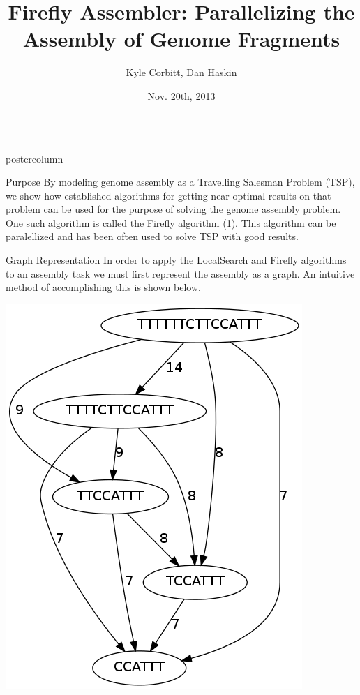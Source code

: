 \documentclass[final,hyperref={pdfpagelabels=false}]{beamer}
\title{\huge Firefly Assembler: Parallelizing the Assembly of Genome Fragments}
\author{Kyle Corbitt, Dan Haskin}
\institute[Brigham Young University]{Molecular Biology and Computer Science Departments}
\date[Nov. 20th, 2013]{Nov. 20th, 2013}
\newlength{\columnheight}
\begin{document}
\begin{frame}
    \begin{columns}
        \begin{column}{.32\textwidth}
            \begin{beamercolorbox}[center,wd=\textwidth]{postercolumn}
                \begin{minipage}[T]{.95\textwidth}
                    \parbox[t][\columnheight]{\textwidth}{
                        \begin{block}{Purpose}
                            By modeling genome assembly as a Travelling
                            Salesman Problem (TSP), we show how established
                            algorithms for getting near-optimal results on that
                            problem can be used for the purpose of solving the
                            genome assembly problem. One such algorithm is called
                            the Firefly algorithm (1).  This algorithm can
                            be paralellized and has been often used to solve
                            TSP with good results.
                        \end{block}
                        \begin{block}{Graph Representation}
                            In order to apply the LocalSearch and Firefly
                            algorithms to an assembly task we must first
                            represent the assembly as a graph.  An intuitive
                            method of accomplishing this is shown below.
                            \begin{center}
                                \includegraphics[scale=0.75]{example_graph}

\end{center}
\end{block}}
\end{minipage}
\end{beamercolorbox}
\end{column}
\end{columns}
\end{frame}
\end{document}
